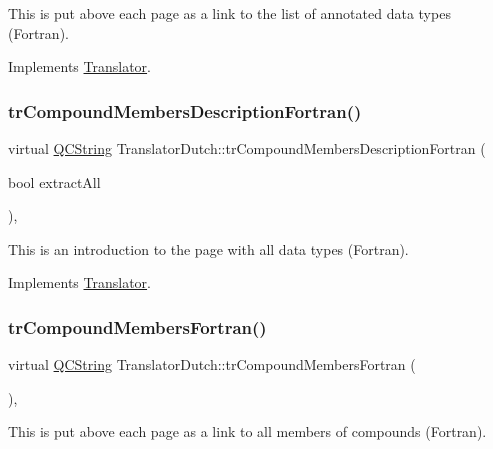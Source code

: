 This is put above each page as a link to the list of annotated data types (Fortran). 

Implements \mbox{\hyperlink{class_translator}{Translator}}.

\mbox{\label{class_translator_dutch_a8e16864f137ab89c0a0d47264ab6eb7e}} 
\subsubsection{\texorpdfstring{trCompoundMembersDescriptionFortran()}{trCompoundMembersDescriptionFortran()}}
{\footnotesize\ttfamily virtual \mbox{\hyperlink{class_q_c_string}{Q\+C\+String}} Translator\+Dutch\+::tr\+Compound\+Members\+Description\+Fortran (\begin{DoxyParamCaption}\item[{bool}]{extract\+All }\end{DoxyParamCaption})\hspace{0.3cm}{\ttfamily [inline]}, {\ttfamily [virtual]}}

This is an introduction to the page with all data types (Fortran). 

Implements \mbox{\hyperlink{class_translator}{Translator}}.

\mbox{\label{class_translator_dutch_ac99a6e250f2ec58407017227412e4ba7}} 
\subsubsection{\texorpdfstring{trCompoundMembersFortran()}{trCompoundMembersFortran()}}
{\footnotesize\ttfamily virtual \mbox{\hyperlink{class_q_c_string}{Q\+C\+String}} Translator\+Dutch\+::tr\+Compound\+Members\+Fortran (\begin{DoxyParamCaption}{ }\end{DoxyParamCaption})\hspace{0.3cm}{\ttfamily [inline]}, {\ttfamily [virtual]}}

This is put above each page as a link to all members of compounds (Fortran). 

